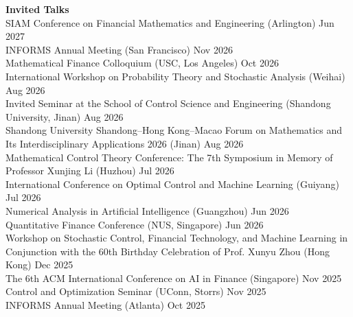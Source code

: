 \documentclass[margin, 10pt]{res} %
\begin{document}
\begin{resume}
\textbf{Invited Talks}\\
SIAM Conference on Financial Mathematics and Engineering (Arlington) \hfill Jun 2027\\
INFORMS Annual Meeting (San Francisco) \hfill Nov 2026\\
Mathematical Finance Colloquium (USC, Los Angeles) \hfill Oct 2026\\
International Workshop on Probability Theory and Stochastic Analysis \newline
\hspace*{1em}(Weihai) \hfill Aug 2026\\
Invited Seminar at the School of Control Science and Engineering \newline
\hspace*{1em}(Shandong University, Jinan) \hfill Aug 2026\\
Shandong University Shandong--Hong Kong--Macao Forum on Mathematics \newline
\hspace*{1em}and Its Interdisciplinary Applications 2026 (Jinan) \hfill Aug 2026\\
Mathematical Control Theory Conference: The 7th Symposium \newline
\hspace*{1em}in Memory of Professor Xunjing Li (Huzhou) \hfill Jul 2026\\
International Conference on Optimal Control and Machine Learning \newline
\hspace*{1em}(Guiyang) \hfill Jul 2026\\
Numerical Analysis in Artificial Intelligence (Guangzhou) \hfill Jun 2026\\
Quantitative Finance Conference (NUS, Singapore) \hfill Jun 2026\\
Workshop on Stochastic Control, Financial Technology, and Machine \newline
\hspace*{1em}Learning in Conjunction with the 60th Birthday Celebration \newline
\hspace*{1em}of Prof. Xunyu Zhou (Hong Kong) \hfill Dec 2025\\
The 6th ACM International Conference on AI in Finance (Singapore) \hfill Nov 2025\\
Control and Optimization Seminar (UConn, Storrs) \hfill Nov 2025\\
INFORMS Annual Meeting (Atlanta) \hfill Oct 2025\\

\end{resume}
\end{document}
